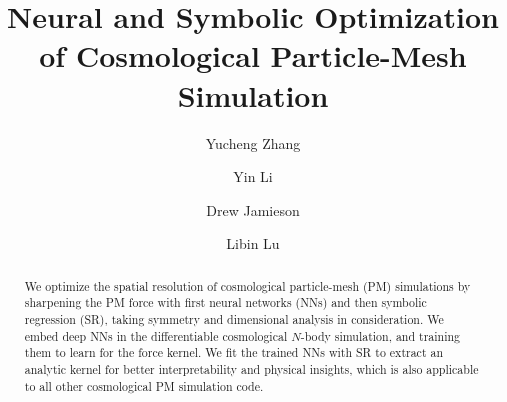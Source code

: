 \documentclass[modern, trackchanges, dvipsnames]{aastex631}
\begin{document}
\title{\large Neural and Symbolic Optimization of Cosmological
Particle-Mesh Simulation
\vspace{0.3em}}


\author[0000-0002-9300-2632]{\normalsize Yucheng Zhang}

\author[0000-0002-0701-1410]{\normalsize Yin Li}

\author[0000-0001-5044-7204]{\normalsize Drew Jamieson}

\author[0000-0003-0745-9431]{\normalsize Libin Lu}








\begin{abstract}

We optimize the spatial resolution of cosmological particle-mesh (PM)
simulations by sharpening the PM force with first neural networks (NNs)
and then symbolic regression (SR), taking symmetry and dimensional
analysis in consideration.
We embed deep NNs in the differentiable cosmological $N$-body
simulation, and training them to learn for the force kernel.
We fit the trained NNs with SR to extract an analytic kernel for better
interpretability and physical insights, which is also applicable to all
other cosmological PM simulation code.

\end{abstract}
\end{document}

